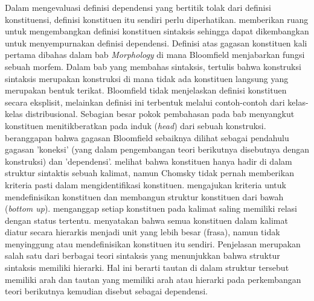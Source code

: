 Dalam mengevaluasi definisi dependensi yang bertitik tolak dari definisi konstituensi, definisi konstituen itu sendiri perlu diperhatikan. \cite{bloomfield1933language} memberikan ruang untuk mengembangkan definisi konstituen sintaksis sehingga dapat dikembangkan untuk menyempurnakan definisi dependensi. Definisi \cite{bloomfield1933language} atas gagasan konstituen kali pertama dibahas dalam bab \textit{Morphology} di mana Bloomfield menjabarkan fungsi sebuah morfem. Dalam bab yang membahas sintaksis, tertulis bahwa konstruksi sintaksis merupakan konstruksi di mana tidak ada konstituen langsung yang merupakan bentuk terikat. Bloomfield tidak menjelaskan definisi konstituen secara eksplisit, melainkan definisi ini terbentuk melalui contoh-contoh dari kelas-kelas distribusional. Sebagian besar pokok pembahasan pada bab menyangkut konstituen menitikberatkan pada induk (\textit{head}) dari sebuah konstruksi. \cite{gerdes2013defining} beranggapan bahwa gagasan Bloomfield sebaiknya dilihat sebagai pendahulu gagasan 'koneksi' (yang dalam pengembangan teori berikutnya disebutnya dengan konstruksi) dan 'dependensi'. \cite{chomsky1986barriers} melihat bahwa konstituen hanya hadir di dalam struktur sintaktis sebuah kalimat, namun Chomsky tidak pernah memberikan kriteria pasti dalam mengidentifikasi konstituen. \cite{gleason1961introduction} mengajukan kriteria untuk mendefinisikan konstituen dan membangun struktur konstituen dari bawah (\textit{bottom up}). \cite{gleason1961introduction} menganggap setiap konstituen pada kalimat saling memiliki relasi dengan status tertentu. \cite{haegeman1994introduction} menyatakan bahwa semua konstituen dalam kalimat diatur secara hierarkis menjadi unit yang lebih besar (frasa), namun tidak menyinggung atau mendefinisikan konstituen itu sendiri. Penjelasan \cite{haegeman1994introduction} merupakan salah satu dari berbagai teori sintaksis yang menunjukkan bahwa struktur sintaksis memiliki hierarki. Hal ini berarti tautan di dalam struktur tersebut memiliki arah dan tautan yang memiliki arah atau hierarki pada perkembangan teori berikutnya kemudian disebut sebagai dependensi. 

